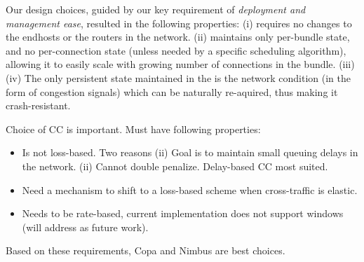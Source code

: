 
 Our design choices, guided by our key requirement of \emph{deployment and management ease}, resulted in the following properties: (i) \name requires no changes to the endhosts or the routers in the network. (ii) \name maintains only per-bundle state, and no per-connection state (unless needed by a specific scheduling algorithm), allowing it to easily scale with growing number of connections in the bundle.  (iii)  (iv) The only persistent state maintained in the \name is the network condition (in the form of congestion signals) which can be naturally re-aquired, thus making it crash-resistant. 






Choice of CC is important. Must have following properties:
\begin{itemize}
    \item Is not loss-based. Two reasons (ii) Goal is to maintain small queuing delays in the network. (ii) Cannot double penalize. Delay-based CC most suited.
    \item Need a mechanism to shift to a loss-based scheme when cross-traffic is elastic.
    \item Needs to be rate-based, current implementation does not support windows (will address as future work). 
\end{itemize}
Based on these requirements, Copa and Nimbus are best choices.


